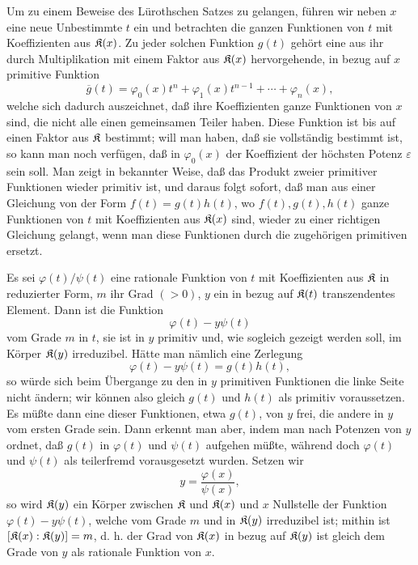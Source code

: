 Um zu einem Beweise des Lürothschen Satzes zu gelangen, führen wir neben \(x\) eine neue Unbestimmte \(t\) ein und betrachten die ganzen Funktionen von \(t\) mit Koeffizienten aus \(\mathfrak K(x)\). Zu jeder solchen Funktion \(g(t)\) gehört eine aus ihr durch Multiplikation mit einem Faktor aus \(\mathfrak K(x)\) hervorgehende, in bezug auf \(x\) primitive Funktion
\[
\overline g(t)=\varphi_0(x)t^n+\varphi_1(x)t^{n-1}+\cdots+\varphi_n(x),
\]
welche sich dadurch auszeichnet, daß ihre Koeffizienten ganze Funktionen von \(x\) sind, die nicht alle einen gemeinsamen Teiler haben. Diese Funktion ist bis auf einen Faktor aus \(\mathfrak K\) bestimmt; will man haben, daß sie vollständig bestimmt ist, so kann man noch verfügen, daß in \(\varphi_0(x)\) der Koeffizient der höchsten Potenz \(\varepsilon\) sein soll. Man zeigt in bekannter Weise, daß das Produkt zweier primitiver Funktionen wieder primitiv ist, und daraus folgt sofort, daß man aus einer Gleichung von der Form \(f(t)=g(t)h(t)\), wo \(f(t),g(t),h(t)\) ganze Funktionen von \(t\) mit Koeffizienten aus \(\mathfrak K(x)\) sind, wieder zu einer richtigen Gleichung gelangt, wenn man diese Funktionen durch die zugehörigen primitiven ersetzt.

Es sei \(\varphi(t)/\psi(t)\) eine rationale Funktion von \(t\) mit Koeffizienten aus \(\mathfrak K\) in reduzierter Form, \(m\) ihr Grad \((>0)\), \(y\) ein in bezug auf \(\mathfrak K(t)\) transzendentes Element. Dann ist die Funktion
\[
\varphi(t)-y\psi(t)
\]
vom Grade \(m\) in \(t\), sie ist in \(y\) primitiv und, wie sogleich gezeigt werden soll, im Körper \(\mathfrak K(y)\) irreduzibel. Hätte man nämlich eine Zerlegung
\[
\varphi(t)-y\psi(t)=g(t)h(t),
\]
so würde sich beim Übergange zu den in \(y\) primitiven Funktionen die linke Seite nicht ändern; wir können also gleich \(g(t)\) und \(h(t)\) als primitiv voraussetzen. Es müßte dann eine dieser Funktionen, etwa \(g(t)\), von \(y\) frei, die andere in \(y\) vom ersten Grade sein. Dann erkennt man aber, indem man nach Potenzen von \(y\) ordnet, daß \(g(t)\) in \(\varphi(t)\) und \(\psi(t)\) aufgehen müßte, während doch \(\varphi(t)\) und \(\psi(t)\) als teilerfremd vorausgesetzt wurden. Setzen wir
\[
y=\frac{\varphi(x)}{\psi(x)},
\]
so wird \(\mathfrak K(y)\) ein Körper zwischen \(\mathfrak K\) und \(\mathfrak K(x)\) und \(x\) Nullstelle der Funktion \(\varphi(t)-y\psi(t)\), welche vom Grade \(m\) und in \(\mathfrak K(y)\) irreduzibel ist; mithin ist \([\mathfrak K(x):\mathfrak K(y)]=m\), d. h. der Grad von \(\mathfrak K(x)\) in bezug auf \(\mathfrak K(y)\) ist gleich dem Grade von \(y\) als rationale Funktion von \(x\).

